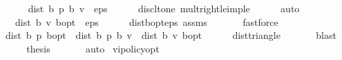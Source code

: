\begin{isabellebody}
\isanewline
\ \ \isamarkupfalse%
\ {\isachardoublequoteopen}{}\ {\isacharasterisk}{\kern0pt}\ dist\ {\isacharparenleft}{\kern0pt}{\isasymnu}\isactrlsub b\ {\isacharquery}{\kern0pt}p{\isacharparenright}{\kern0pt}\ {\isacharparenleft}{\kern0pt}{\isasymL}\isactrlsub b\ v{\isacharparenright}{\kern0pt}\ {\isasymle}\ eps{\isachardoublequoteclose}\isanewline
\ \ \ \ \isamarkupfalse%
\ disc{\isacharunderscore}{\kern0pt}lt{\isacharunderscore}{\kern0pt}one\ mult{\isacharunderscore}{\kern0pt}right{\isacharunderscore}{\kern0pt}le{\isacharunderscore}{\kern0pt}imp{\isacharunderscore}{\kern0pt}le\isanewline
\ \ \ \ \isamarkupfalse%
\ auto\isanewline
\ \ \isamarkupfalse%
\ \isamarkupfalse%
\ {\isachardoublequoteopen}{}\ {\isacharasterisk}{\kern0pt}\ dist\ {\isacharparenleft}{\kern0pt}{\isasymL}\isactrlsub b\ v{\isacharparenright}{\kern0pt}\ {\isasymnu}\isactrlsub b{\isacharunderscore}{\kern0pt}opt\ {\isacharless}{\kern0pt}\ eps{\isachardoublequoteclose}\isanewline
\ \ \ \ \isamarkupfalse%
\ dist{\isacharunderscore}{\kern0pt}{\isasymL}\isactrlsub b{\isacharunderscore}{\kern0pt}opt{\isacharunderscore}{\kern0pt}eps\ assms\ \isanewline
\ \ \ \ \isamarkupfalse%
\ fastforce\isanewline
\ \ \isamarkupfalse%
\ \isamarkupfalse%
\ {\isachardoublequoteopen}dist\ {\isacharparenleft}{\kern0pt}{\isasymnu}\isactrlsub b\ {\isacharquery}{\kern0pt}p{\isacharparenright}{\kern0pt}\ {\isasymnu}\isactrlsub b{\isacharunderscore}{\kern0pt}opt\ {\isasymle}\ dist\ {\isacharparenleft}{\kern0pt}{\isasymnu}\isactrlsub b\ {\isacharquery}{\kern0pt}p{\isacharparenright}{\kern0pt}\ {\isacharparenleft}{\kern0pt}{\isasymL}\isactrlsub b\ v{\isacharparenright}{\kern0pt}\ {\isacharplus}{\kern0pt}\ dist\ {\isacharparenleft}{\kern0pt}{\isasymL}\isactrlsub b\ v{\isacharparenright}{\kern0pt}\ {\isasymnu}\isactrlsub b{\isacharunderscore}{\kern0pt}opt{\isachardoublequoteclose}\isanewline
\ \ \ \ \isamarkupfalse%
\ dist{\isacharunderscore}{\kern0pt}triangle\ \isanewline
\ \ \ \ \isamarkupfalse%
\ blast\ \ \isanewline
\ \ \isamarkupfalse%
\ \isamarkupfalse%
\ {\isacharquery}{\kern0pt}thesis\ \isanewline
\ \ \ \ \isamarkupfalse%
\ auto\isanewline
{}\isamarkupfalse%
%
\endisatagproof
{\isafoldproof}%
%
\isadelimproof
\isanewline
%
\endisadelimproof
\isanewline
{}\isamarkupfalse%
\ vi{\isacharunderscore}{\kern0pt}policy{\isacharprime}{\kern0pt}{\isacharunderscore}{\kern0pt}opt{\isacharcolon}{\kern0pt}\isanewline

\end{isabellebody}
